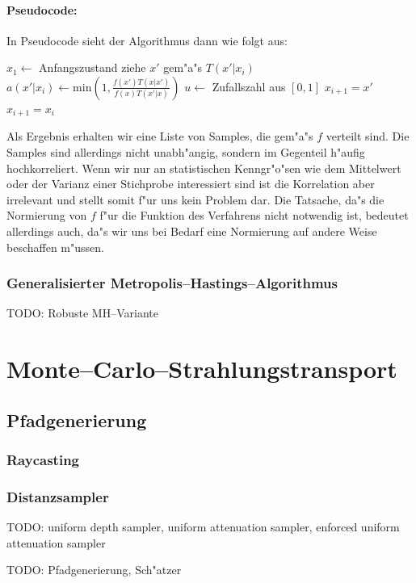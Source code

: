 	\paragraph{Pseudocode:}
	In Pseudocode sieht der Algorithmus dann wie folgt aus:
	\begin{algorithmic}
		\STATE $x_1 \leftarrow$ Anfangszustand
			\STATE ziehe $x'$ gem"a"s $T(x'|x_i)$
			\STATE $a(x'|x_i) \leftarrow \text{min}\left(1, \frac{f(x')T(x|x')}{f(x)T(x'|x)}\right)$
			\STATE $u\leftarrow$ Zufallszahl aus $[0,1]$
				\STATE $x_{i+1}=x'$
			\ELSE	\STATE $x_{i+1}=x_i$
			\ENDIF
	  \ENDFOR
	\end{algorithmic}
	Als Ergebnis erhalten wir eine Liste von Samples, die gem"a"s $f$ verteilt sind. Die Samples sind allerdings nicht unabh"angig, sondern im Gegenteil h"aufig hochkorreliert. Wenn wir nur an statistischen Kenngr"o"sen wie dem Mittelwert oder der Varianz einer Stichprobe interessiert sind ist die Korrelation aber irrelevant und stellt somit f"ur uns kein Problem dar. Die Tatsache, da"s die Normierung von $f$ f"ur die Funktion des Verfahrens nicht notwendig ist, bedeutet allerdings auch, da"s wir uns bei Bedarf eine Normierung auf andere Weise beschaffen m"ussen.
	
	
	\subsubsection{Generalisierter Metropolis--Hastings--Algorithmus}
	TODO: Robuste MH--Variante

	\section{Monte--Carlo--Strahlungstransport}
	\subsection{Pfadgenerierung}
	\subsubsection{Raycasting}
	\subsubsection{Distanzsampler}
	TODO: uniform depth sampler, uniform attenuation sampler, enforced uniform attenuation sampler
	
	TODO: Pfadgenerierung, Sch"atzer

